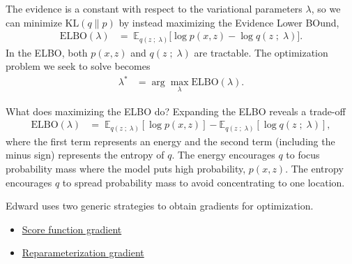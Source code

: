 The evidence is a constant with respect to the variational parameters $\lambda$,
so we can minimize $\text{KL}(q\|p)$ by instead maximizing
the Evidence Lower BOund,
\begin{align*}
  \text{ELBO}(\lambda)
  &=\;
  \mathbb{E}_{q(z\;;\;\lambda)}
  \big[
  \log p(x, z)
  -
  \log q(z\;;\;\lambda)
  \big].
\end{align*}
In the ELBO, both $p(x,z)$ and $q(z\;;\;\lambda)$ are
tractable. The optimization problem we seek to solve becomes
\begin{align*}
  \lambda^*
  &=
  \arg \max_\lambda \text{ELBO}(\lambda).
\end{align*}

What does maximizing the ELBO do? Expanding the ELBO reveals a trade-off
\begin{align*}
  \text{ELBO}(\lambda)
  &=\;
  \mathbb{E}_{q(z \;;\; \lambda)}[\log p(x, z)]
  - \mathbb{E}_{q(z \;;\; \lambda)}[\log q(z\;;\;\lambda)],
\end{align*}
where the first term represents an energy and the second term
(including the minus sign) represents the entropy of $q$.
The energy encourages $q$ to focus probability mass where the
model puts high probability, $p(x, z)$.
The entropy encourages $q$ to spread probability mass to avoid
concentrating to one location.

Edward uses two generic strategies to obtain gradients for
optimization.
\begin{itemize}
    \item \href{tut_KLqp_score.html}{Score function gradient}
    \item \href{tut_KLqp_reparam.html}{Reparameterization gradient}
  \end{itemize}

